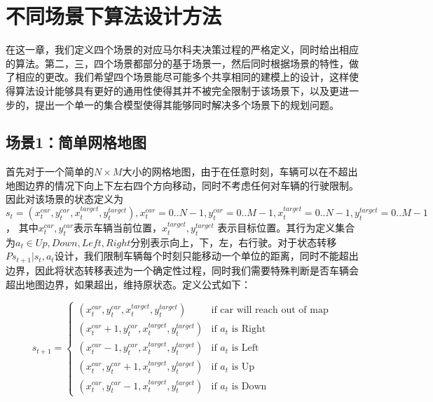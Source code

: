 \documentclass{standalone}
\begin{document}
\section{不同场景下算法设计方法}
在这一章，我们定义四个场景的对应马尔科夫决策过程的严格定义，同时给出相应的算法。第二，三，四个场景都部分的基于场景一，然后同时根据场景的特性，做了相应的更改。我们希望四个场景能尽可能多个共享相同的建模上的设计，这样使得算法设计能够具有更好的通用性使得其并不被完全限制于该场景下，以及更进一步的，提出一个单一的集合模型使得其能够同时解决多个场景下的规划问题。
\subsection{场景1：简单网格地图}
首先对于一个简单的$N \times M$大小的网格地图，由于在任意时刻，车辆可以在不超出地图边界的情况下向上下左右四个方向移动，同时不考虑任何对车辆的行驶限制。因此对该场景的状态定义为$s_t = (x_t^{car}, y_t^{car}, x^{target}_t, y^{target}_t), x_t^{car}=0..N-1, y_t^{car}=0..M-1, x^{target}_t=0..N-1, y^{target}_t=0..M-1$， 其中$x_t^{car}, y_t^{car}$表示车辆当前位置，$x^{target}_t, y^{target}_t$ 表示目标位置。其行为定义集合为$a_t \in {Up, Down, Left, Right}$分别表示向上，下，左，右行驶。对于状态转移$P{s_{t+1}|s_t, a_t}$设计，我们限制车辆每个时刻只能移动一个单位的距离，同时不能超出边界，因此将状态转移表述为一个确定性过程，同时我们需要特殊判断是否车辆会超出地图边界，如果超出，维持原状态。定义公式如下：
\begin{center}
    \begin{equation}
    s_{t+1} = \begin{cases}
    (x_t^{car}, y_t^{car}, x^{target}_t, y^{target}_t) &\mbox{if car will reach out of map}\\
    (x_t^{car} + 1, y_t^{car}, x^{target}_t, y^{target}_t) &\mbox{if $a_t$ is Right}\\
    (x_t^{car} - 1, y_t^{car}, x^{target}_t, y^{target}_t) &\mbox{if $a_t$ is Left}\\
    (x_t^{car}, y_t^{car} + 1, x^{target}_t, y^{target}_t) &\mbox{if $a_t$ is Up}\\
    (x_t^{car}, y_t^{car} - 1, x^{target}_t, y^{target}_t) &\mbox{if $a_t$ is Down}
    \end{cases}
\end{equation}
\end{center}
\end{document}
